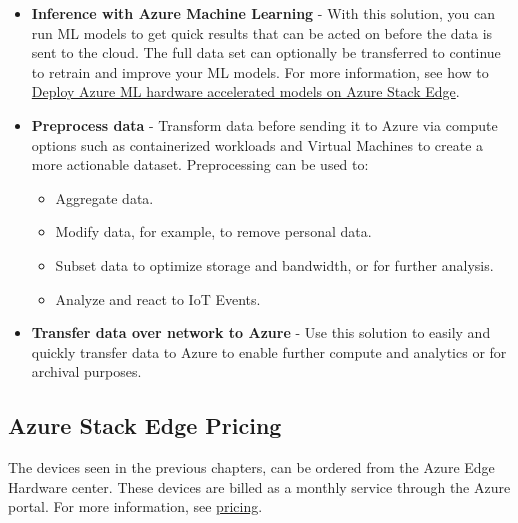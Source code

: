 \documentclass[a4paper]{article}
\begin{document}
    \begin{itemize}
        \item \textbf{Inference with Azure Machine Learning} - With this solution, you can run ML models to get quick results that can be acted on before the data is sent to the cloud. The full data set can optionally be transferred to continue to retrain and improve your ML models. For more information, see how to \href{https://learn.microsoft.com/en-us/azure/machine-learning/how-to-deploy-fpga-web-service#deploy-to-a-local-edge-server}{Deploy Azure ML hardware accelerated models on Azure Stack Edge}.

        \item \textbf{Preprocess data} - Transform data before sending it to Azure via compute options such as containerized workloads and Virtual Machines to create a more actionable dataset. Preprocessing can be used to:
        \begin{itemize}
            \item Aggregate data.
            \item Modify data, for example, to remove personal data.
            \item Subset data to optimize storage and bandwidth, or for further analysis.
            \item Analyze and react to IoT Events.
        \end{itemize}

        \item \textbf{Transfer data over network to Azure} - Use this solution to easily and quickly transfer data to Azure to enable further compute and analytics or for archival purposes.
    \end{itemize}

    \newpage

    \subsection{Azure Stack Edge Pricing}\label{subsection: azure stack edge pricing}

    The devices seen in the previous chapters, can be ordered from the Azure Edge Hardware center. These devices are billed as a monthly service through the Azure portal. For more information, see \href{https://azure.microsoft.com/en-gb/pricing/details/azure-stack/edge/#pricing}{pricing}.
\end{document}
